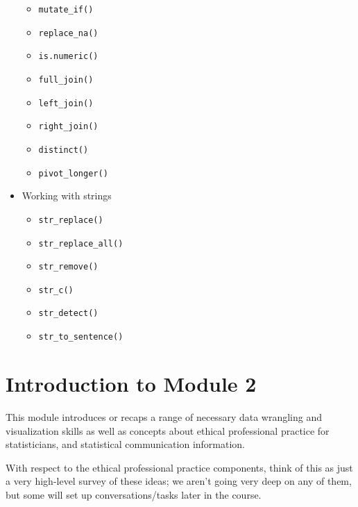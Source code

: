 \documentclass[
  openany]{book}
\providecommand{\tightlist}{%
  \setlength{\itemsep}{0pt}\setlength{\parskip}{0pt}}
\begin{document}
\begin{itemize}
  \begin{itemize}
  \tightlist
  \item
    \texttt{mutate\_if()}
  \item
    \texttt{replace\_na()}
  \item
    \texttt{is.numeric()}
  \item
    \texttt{full\_join()}
  \item
    \texttt{left\_join()}
  \item
    \texttt{right\_join()}
  \item
    \texttt{distinct()}~\\
  \item
    \texttt{pivot\_longer()}
  \end{itemize}
\item
  Working with strings

  \begin{itemize}
  \tightlist
  \item
    \texttt{str\_replace()}~\\
  \item
    \texttt{str\_replace\_all()}~\\
  \item
    \texttt{str\_remove()}~\\
  \item
    \texttt{str\_c()}~\\
  \item
    \texttt{str\_detect()}~\\
  \item
    \texttt{str\_to\_sentence()}
  \end{itemize}
\end{itemize}

\hypertarget{introduction-to-module-2}{%
\section{Introduction to Module 2}\label{introduction-to-module-2}}

This module introduces or recaps a range of necessary data wrangling and visualization skills as well as concepts about ethical professional practice for statisticians, and statistical communication information.

With respect to the ethical professional practice components, think of this as just a very high-level survey of these ideas; we aren't going very deep on any of them, but some will set up conversations/tasks later in the course.
\end{document}

